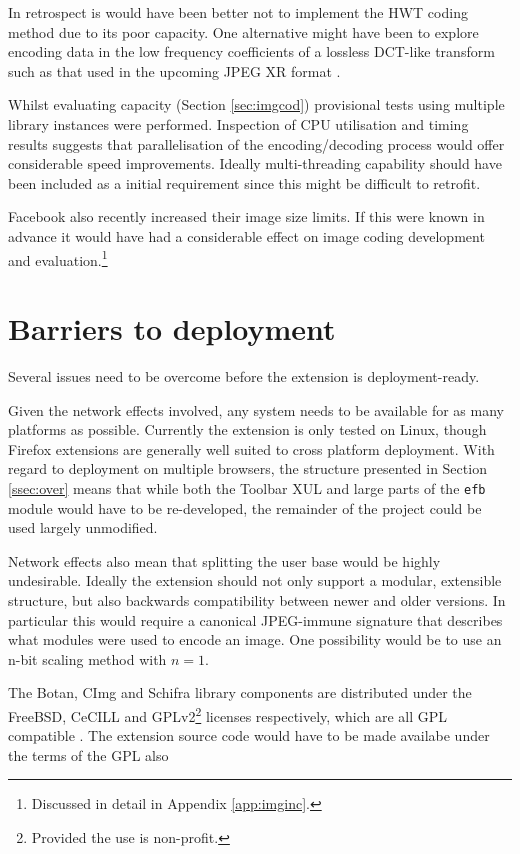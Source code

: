 In retrospect is would have been better not to implement the HWT coding method due to its poor capacity. One alternative might have been to explore encoding data in the low frequency coefficients of a lossless DCT-like transform such as that used in the upcoming JPEG XR format \cite{jpegxr}.

Whilst evaluating capacity (Section \ref{sec:imgcod}) provisional tests using multiple library instances were performed. Inspection of CPU utilisation and timing results suggests that parallelisation of the encoding/decoding process would offer considerable speed improvements. Ideally multi-threading capability should have been included as a initial requirement since this might be difficult to retrofit.

Facebook also recently increased their image size limits. If this were known in advance it would have had a considerable effect on image coding development and evaluation.\footnote{Discussed in detail in Appendix \ref{app:imginc}.}

\section{Barriers to deployment}
\label{sec:deploy}

Several issues need to be overcome before the extension is deployment-ready.

Given the network effects involved, any system needs to be available for as many platforms as possible. Currently the extension is only tested on Linux, though Firefox extensions are generally well suited to cross platform deployment. With regard to deployment on multiple browsers, the structure presented in Section \ref{ssec:over} means that while both the Toolbar XUL and large parts of the {\tt efb} module would have to be re-developed, the remainder of the project could be used largely unmodified.

Network effects also mean that splitting the user base would be highly undesirable. Ideally the extension should not only support a modular, extensible structure, but also backwards compatibility between newer and older versions. In particular this would require a canonical JPEG-immune signature that describes what modules were used to encode an image. One possibility would be to use an n-bit scaling method with $n=1$.

The Botan, CImg and Schifra library components are distributed under the FreeBSD, CeCILL and GPLv2\footnote{Provided the use is non-profit.} licenses respectively, which are all GPL compatible \cite{gpl}. The extension source code would have to be made availabe under the terms of the GPL also


